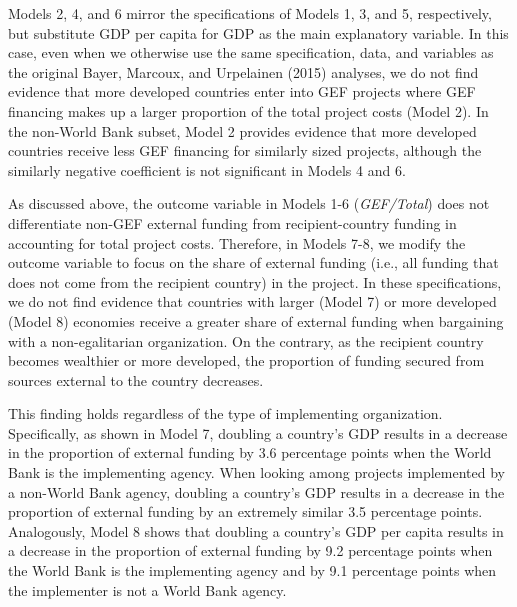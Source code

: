 \documentclass{article}
\begin{document}
Models 2, 4, and 6 mirror the specifications of Models 1, 3, and 5, respectively, but substitute GDP per capita for GDP as the main explanatory variable.  In this case, even when we otherwise use the same specification, data, and variables as the original Bayer, Marcoux, and Urpelainen (2015) analyses, we do not find evidence that more developed countries enter into GEF projects where GEF financing makes up a larger proportion of the total project costs (Model 2).  In the non-World Bank subset, Model 2 provides evidence that more developed countries receive less GEF financing for similarly sized projects, although the similarly negative coefficient is not significant in Models 4 and 6. 

As discussed above, the outcome variable in Models 1-6 (\textit{GEF/Total}) does not differentiate non-GEF external funding from recipient-country funding in accounting for total project costs.  Therefore, in Models 7-8, we modify the outcome variable to focus on the share of external funding (i.e., all funding that does not come from the recipient country) in the project.  In these specifications, we do not find evidence that countries with larger (Model 7) or more developed (Model 8) economies receive a greater share of external funding when bargaining with a non-egalitarian organization.  On the contrary, as the recipient country becomes wealthier or more developed, the proportion of funding secured from sources external to the country decreases.  

This finding holds regardless of the type of implementing organization.  Specifically, as shown in Model 7, doubling a country’s GDP results in a decrease in the proportion of external funding by 3.6 percentage points when the World Bank is the implementing agency. When looking among projects implemented by a non-World Bank agency, doubling a country’s GDP results in a decrease in the proportion of external funding by an extremely similar 3.5 percentage points.  Analogously, Model 8 shows that doubling a country’s GDP per capita results in a decrease in the proportion of external funding by 9.2 percentage points when the World Bank is the implementing agency and by 9.1 percentage points when the implementer is not a World Bank agency.  
\end{document}
